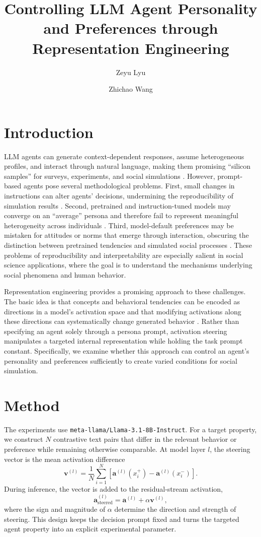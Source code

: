 \documentclass[onecolumn]{../../../../../template/Research-project-manuscript-template/main}
\title{Controlling LLM Agent Personality and Preferences through Representation Engineering}
\author[1]{Zeyu Lyu}
\author[1]{Zhichao Wang}
\affiliation[1]{Graduate School of Arts and Letters, Tohoku University}
\begin{document}
\maketitle

\section{Introduction}
LLM agents can generate context-dependent responses, assume heterogeneous profiles, and interact through natural language, making them promising ``silicon samples'' for surveys, experiments, and social simulations \citep{argyle2023,park2023,anthis2025}. However, prompt-based agents pose several methodological problems. First, small changes in instructions can alter agents' decisions, undermining the reproducibility of simulation results \citep{loya2023}. Second, pretrained and instruction-tuned models may converge on an ``average'' persona and therefore fail to represent meaningful heterogeneity across individuals \citep{argyle2023,bisbee2024,wang2025}. Third, model-default preferences may be mistaken for attitudes or norms that emerge through interaction, obscuring the distinction between pretrained tendencies and simulated social processes \citep{bail2024}. These problems of reproducibility and interpretability are especially salient in social science applications, where the goal is to understand the mechanisms underlying social phenomena and human behavior.

Representation engineering provides a promising approach to these challenges. The basic idea is that concepts and behavioral tendencies can be encoded as directions in a model's activation space and that modifying activations along these directions can systematically change generated behavior \citep{turner2023,konen2024}. Rather than specifying an agent solely through a persona prompt, activation steering manipulates a targeted internal representation while holding the task prompt constant. Specifically, we examine whether this approach can control an agent's personality and preferences sufficiently to create varied conditions for social simulation.

\section{Method}
The experiments use \texttt{meta-llama/Llama-3.1-8B-Instruct}. For a target property, we construct $N$ contrastive text pairs that differ in the relevant behavior or preference while remaining otherwise comparable. At model layer $l$, the steering vector is the mean activation difference
\begin{equation}
 \bm{v}^{(l)}=\frac{1}{N}\sum_{i=1}^{N}\left[\bm{a}^{(l)}(x_i^+)-\bm{a}^{(l)}(x_i^-)\right].
\end{equation}
During inference, the vector is added to the residual-stream activation,
\begin{equation}
 \bm{a}^{(l)}_{\mathrm{steered}}=\bm{a}^{(l)}+\alpha\bm{v}^{(l)},
\end{equation}
where the sign and magnitude of $\alpha$ determine the direction and strength of steering. This design keeps the decision prompt fixed and turns the targeted agent property into an explicit experimental parameter.
\end{document}
